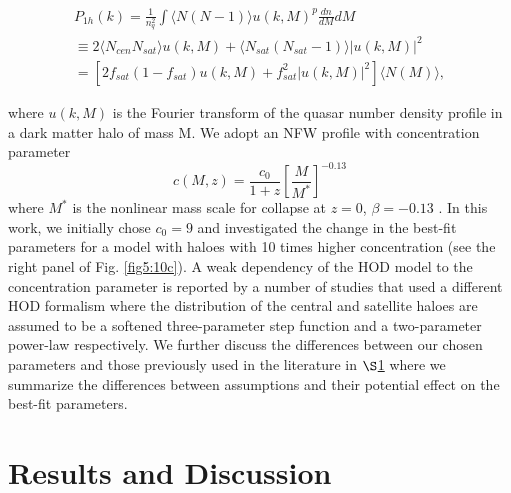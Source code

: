 \documentclass[useAMS,usenatbib]{mn2e}
\begin{document}
 \begin{multline}
P_{1h}(k) = \frac{1}{n^{2}_{q}} \int \langle N(N-1)\rangle u(k,M)^p \frac{dn}{dM} dM  \\
\equiv 2 \langle N_{cen} N_{sat}\rangle u(k,M) + \langle N_{sat}(N_{sat}-1)\rangle |u(k,M)|^2 \\
%  
= [2 f_{sat}(1-f_{sat}) u(k,M)+f_{sat}^2 |u(k,M)|^2] \langle N(M)\rangle,
 \end{multline}

where $u(k,M)$ is the Fourier transform of the quasar number density profile in 
a dark matter halo of mass M. We adopt an NFW profile \citep{nfw97} with 
concentration parameter
\begin{equation}
c(M,z) = \frac{c_{0}}{1+z}[\frac{M}{M^{*}}]^{-0.13}
\end{equation}
 where $M^{*}$ is the nonlinear mass scale for collapse at $z=0$, $\beta = 
-0.13$ \citep{cs02}. In this work, we initially chose $c_0=9$ and investigated 
the change in the best-fit parameters for a model with haloes with 10 times 
higher concentration (see the right panel of Fig. \ref{fig5:10c}). A weak 
dependency of the HOD model to the concentration parameter is reported by a 
number of studies \citep{ric12,ric13,sh13} that used a different HOD formalism 
where the distribution of the central and satellite haloes are assumed to be a 
softened three-parameter step function and a two-parameter power-law 
respectively.
 We further discuss the differences between our chosen parameters and those 
previously used in the literature in $\S$\ref{res} where we summarize the 
differences between assumptions and their potential effect on the best-fit 
parameters.    

\section{Results and Discussion}\label{res}
\end{document}
